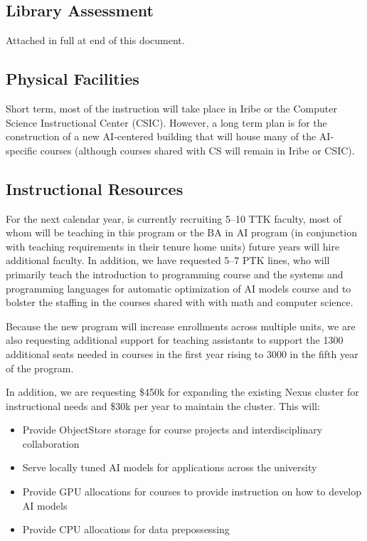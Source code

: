 
\newcommand{\ptkfaculty}{5--7}
\newcommand{\ttkfaculty}{5--10}
\newcommand{\advisors}{5}
\newcommand{\admin}{1}
\newcommand{\cloud}{30k}
\newcommand{\upfrontcluster}{450k}
\newcommand{\continuingcluster}{30k}

\subsection{Library Assessment}

Attached in full at end of this document.

\subsection{Physical Facilities}

Short term, most of the instruction will take place in Iribe or the Computer Science Instructional Center (CSIC).  However, a long term plan is for the construction of a new AI-centered building that will house many of the AI-specific courses (although courses shared with CS will remain in Iribe or CSIC).

\subsection{Instructional Resources}

For the next calendar year, \aim{} is currently recruiting \ttkfaculty{} TTK faculty, most of whom will be teaching in this program or the BA in AI program (in conjunction with teaching requirements in their tenure home units) future years will hire additional faculty.  In addition, we have requested \ptkfaculty{} PTK lines, who will primarily teach the introduction to programming course and the systems and programming languages for automatic optimization of AI models course and to bolster the staffing in the courses shared with with math and computer science.

Because the new program will increase enrollments across multiple units, we are also requesting additional support for teaching assistants to support the 1300 additional seats needed in courses in the first year rising to 3000 in the fifth year of the program.

In addition, we are requesting \$\upfrontcluster{} for expanding the existing Nexus cluster for instructional needs and \$\continuingcluster{} per year to maintain the cluster.  This will:
\begin{itemize}
    \item Provide ObjectStore storage for course projects and interdisciplinary collaboration
    \item Serve locally tuned AI models for applications across the university
    \item Provide GPU allocations for courses to provide instruction on how to develop AI models
    \item Provide CPU allocations for data prepossessing
\end{itemize}

